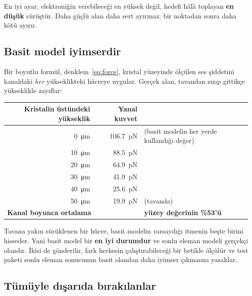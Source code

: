 \documentclass[11pt,a4paper]{article}
\begin{document}
\begin{warnbox}
En iyi ayar, elektroniğin verebileceği en yüksek değil, hedefi hâlâ toplayan
\textbf{en düşük} sürüştür. Daha güçlü alan daha sert ayırmaz; bir noktadan sonra
daha kötü ayırır.
\end{warnbox}

\subsection*{Basit model iyimserdir}

Bir boyutlu formül, denklem~\eqref{eq:force}, kristal yüzeyinde ölçülen ses
şiddetini kanaldaki \emph{her} yükseklikteki hücreye uygular. Gerçek alan,
tavandan sızıp gittikçe yükseklikle zayıflar:

\begin{center}\small
\begin{tabular}{rrl}
\toprule
\textbf{Kristalin üstündeki yükseklik} & \textbf{Yanal kuvvet} & \\
\midrule
\SI{0}{\micro\meter}  & \SI{106,7}{\pico\newton} & (basit modelin her yerde kullandığı değer) \\
\SI{10}{\micro\meter} & \SI{88,5}{\pico\newton}  & \\
\SI{20}{\micro\meter} & \SI{64,9}{\pico\newton}  & \\
\SI{30}{\micro\meter} & \SI{41,9}{\pico\newton}  & \\
\SI{40}{\micro\meter} & \SI{25,6}{\pico\newton}  & \\
\SI{50}{\micro\meter} & \SI{19,9}{\pico\newton}  & (tavanda) \\
\midrule
\multicolumn{2}{l}{\textbf{Kanal boyunca ortalama}} & \textbf{yüzey değerinin \%53'ü} \\
\bottomrule
\end{tabular}
\end{center}

Tavana yakın sürüklenen bir hücre, basit modelin varsaydığı itmenin beşte birini
hisseder. Yani basit model bir \textbf{en iyi durumdur} ve sonlu eleman modeli
gerçekçi olandır. İkisi de gönderilir, fark herkesin çalıştırabileceği bir
betikle ölçülür ve test paketi sonlu eleman sonucunun basit olandan daha iyimser
çıkmasını yasaklar.

\subsection*{Tümüyle dışarıda bırakılanlar}
\end{document}
